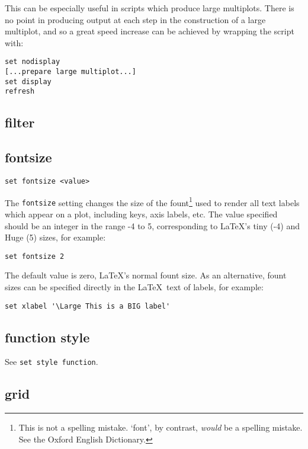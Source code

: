 This can be especially useful in scripts which produce large multiplots. There
is no point in producing output at each step in the construction of a large
multiplot, and so a great speed increase can be achieved by wrapping the script
with:

\begin{verbatim}
set nodisplay
[...prepare large multiplot...]
set display
refresh
\end{verbatim}


\subsection{filter}


\subsection{fontsize}

\begin{verbatim}
set fontsize <value>
\end{verbatim}

The {\tt fontsize} setting changes the size of the fount\footnote{This is not a
spelling mistake. `font', by contrast, \textit{would} be a spelling mistake. See the
Oxford English Dictionary.} used to render all text labels which appear on a
plot, including keys, axis labels, etc. The value specified should be an integer
in the range -4 to 5, corresponding to \LaTeX's tiny (-4) and Huge (5) sizes,
for example:

\begin{verbatim}
set fontsize 2
\end{verbatim}

The default value is zero, \LaTeX's normal fount size. As an alternative, fount
sizes can be specified directly in the \LaTeX\ text of labels, for example:

\begin{verbatim}
set xlabel '\Large This is a BIG label'
\end{verbatim}


\subsection{function style}

See {\tt set style function}.


\subsection{grid}

